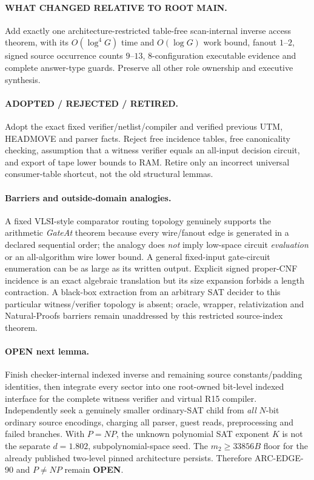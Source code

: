 \documentclass[11pt]{article}
\newcommand{\OPEN}{\textbf{OPEN}}
\begin{document}
\paragraph{WHAT CHANGED RELATIVE TO ROOT MAIN.} Add exactly one architecture-restricted table-free scan-internal inverse access theorem, with its $O(\log^4G)$ time and $O(\log G)$ work bound, fanout $1$--$2$, signed source occurrence counts $9$--$13$, 8-configuration executable evidence and complete answer-type guards. Preserve all other role ownership and executive synthesis. \paragraph{ADOPTED / REJECTED / RETIRED.} Adopt the exact fixed verifier/netlist/compiler and verified previous UTM, HEADMOVE and parser facts. Reject free incidence tables, free canonicality checking, assumption that a witness verifier equals an all-input decision circuit, and export of tape lower bounds to RAM. Retire only an incorrect universal consumer-table shortcut, not the old structural lemmas.

\paragraph{Barriers and outside-domain analogies.} A fixed VLSI-style comparator routing topology genuinely supports the arithmetic \emph{GateAt} theorem because every wire/fanout edge is generated in a declared sequential order; the analogy does \emph{not} imply low-space circuit \emph{evaluation} or an all-algorithm wire lower bound. A general fixed-input gate-circuit enumeration can be as large as its written output. Explicit signed proper-CNF incidence is an exact algebraic translation but its size expansion forbids a length contraction. A black-box extraction from an arbitrary SAT decider to this particular witness/verifier topology is absent; oracle, wrapper, relativization and Natural-Proofs barriers remain unaddressed by this restricted source-index theorem.

\paragraph{OPEN next lemma.} Finish checker-internal indexed inverse and remaining source constants/padding identities, then integrate every sector into one root-owned bit-level indexed interface for the complete witness verifier and virtual R15 compiler. Independently seek a genuinely smaller ordinary-SAT child from \emph{all} $N$-bit ordinary source encodings, charging all parser, guest reads, preprocessing and failed branches. With $P=NP$, the unknown polynomial SAT exponent $K$ is not the separate $d=1.802$, subpolynomial-space seed. The $m_2\ge33856B$ floor for the already published two-level pinned architecture persists. Therefore ARC-EDGE-90 and $P\ne NP$ remain \OPEN.
\end{document}

